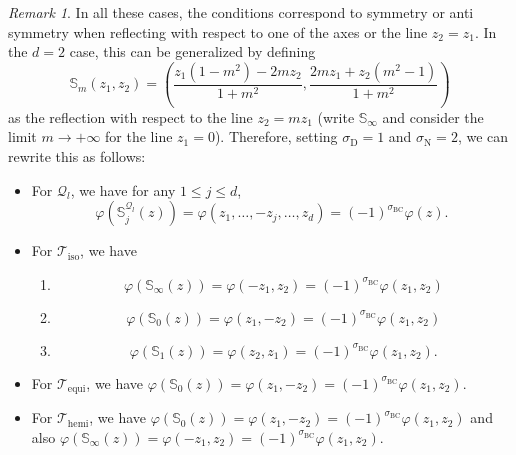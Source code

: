 \documentclass{amsart}
\theoremstyle{definition}
\theoremstyle{remark}
\newtheorem{remark}[theorem]{Remark}
\newcommand{\vp}{\varphi}
\renewcommand\leq\leqslant
\numberwithin{equation}{section}
\theoremstyle{definition}
\theoremstyle{remark}
\begin{document}
\begin{remark}\label{conditions}
	In all these cases, the conditions correspond to symmetry or anti symmetry when reflecting with respect to one of the axes or the line $z_2=z_1$.  In the $d=2$ case, this can be generalized by defining \begin{equation}\label{reflex}
		\mathbb{S}_{m}\left(z_1,z_2\right)=\left(\frac{z_1\left(1-m^2\right)-2mz_2}{1+m^2},\frac{2mz_1+z_2\left(m^2-1\right)}{1+m^2}\right)
	\end{equation} as the reflection with respect to the line $z_2=mz_1$ (write $\mathbb{S}_\infty$ and consider the limit $m\rightarrow+\infty$ for the line $z_1=0$). Therefore, setting $\sigma_{\mathrm{D}}=1$ and $\sigma_{\mathrm{N}}=2$, we can rewrite this as follows:
	\begin{itemize}
		\item For $\mathcal{Q}_l$, we have for any $1\leq j\leq d$, \begin{equation}\label{sim}\varphi\left(\mathbb{S}_j^{\mathcal{Q}_l}\left(z\right)\right)=\varphi\left(z_1,\ldots,-z_j,\ldots,z_d\right)=\left(-1\right)^{\sigma_{\mathrm{BC}}}\varphi(z).\end{equation} 
		\item For $\mathcal{T}_{\mathrm{iso}}$, we have \begin{enumerate}
			\item \begin{equation}\vp\left(\mathbb{S}_\infty\left(z\right)\right)=\vp(-z_1,z_2)=\left(-1\right)^{\sigma_{\mathrm{BC}}}\vp(z_1,z_2)\end{equation}
			\item \begin{equation}
			    \vp\left(\mathbb{S}_0\left(z\right)\right)=\vp(z_1,-z_2)=\left(-1\right)^{\sigma_{\mathrm{BC}}}\vp(z_1,z_2)
			\end{equation}
			\item \begin{equation}\vp\left(\mathbb{S}_1\left(z\right)\right)=\vp(z_2,z_1)=\left(-1\right)^{\sigma_{\mathrm{BC}}}\vp(z_1,z_2).\end{equation}
		\end{enumerate}
		\item For $\mathcal{T}_{\mathrm{equi}}$, we have  $\vp\left(\mathbb{S}_0\left(z\right)\right)=\vp(z_1,-z_2)=\left(-1\right)^{\sigma_{\mathrm{BC}}}\vp(z_1,z_2)$.
			\item For $\mathcal{T}_{\mathrm{hemi}}$, we have  $\vp\left(\mathbb{S}_0\left(z\right)\right)=\vp(z_1,-z_2)=\left(-1\right)^{\sigma_{\mathrm{BC}}}\vp(z_1,z_2)$ and also $\vp\left(\mathbb{S}_\infty\left(z\right)\right)=\vp(-z_1,z_2)=\left(-1\right)^{\sigma_{\mathrm{BC}}}\vp(z_1,z_2)$.
	\end{itemize}
	\end{remark}
\end{document}
